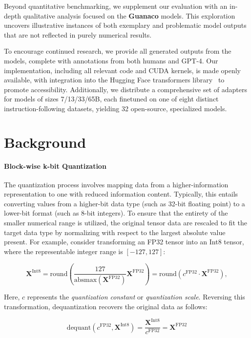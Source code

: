 Beyond quantitative benchmarking, we supplement our evaluation with an in-depth qualitative analysis focused on the \textbf{Guanaco} models. This exploration uncovers illustrative instances of both exemplary and problematic model outputs that are not reflected in purely numerical results.

To encourage continued research, we provide all generated outputs from the models, complete with annotations from both humans and GPT-4. Our implementation, including all relevant code and CUDA kernels, is made openly available, with integration into the Hugging Face transformers library~\citep{wolf2019huggingface} to promote accessibility. Additionally, we distribute a comprehensive set of adapters for models of sizes 7/13/33/65B, each finetuned on one of eight distinct instruction-following datasets, yielding 32 open-source, specialized models.

\section{Background}
\paragraph{Block-wise k-bit Quantization} The quantization process involves mapping data from a higher-information representation to one with reduced information content. Typically, this entails converting values from a higher-bit data type (such as 32-bit floating point) to a lower-bit format (such as 8-bit integers). To ensure that the entirety of the smaller numerical range is utilized, the original tensor data are rescaled to fit the target data type by normalizing with respect to the largest absolute value present. For example, consider transforming an FP32 tensor into an Int8 tensor, where the representable integer range is $[-127, 127]$:

\begin{equation}
    \mathbf{X}^{ \text{Int8}} = \text{round}\left( \frac{127}{{\text{absmax}}(\mathbf{X}^{{\text{FP32}}})}\mathbf{X}^{{\text{FP32}}} \right) = \text{round}(c^{\text{FP32}}\cdot \mathbf{X}^{{\text{FP32}}}),
\end{equation}

Here, $c$ represents the {\em quantization constant} or {\em quantization scale}. Reversing this transformation, dequantization recovers the original data as follows:

\begin{equation}
    \text{dequant}(c^{\text{FP32}}, \mathbf{X}^{\text{Int8}}) = \frac{\mathbf{X}^{\text{Int8}}}{c^{\text{FP32}}} = \mathbf{X}^{\text{FP32}}
\end{equation}

